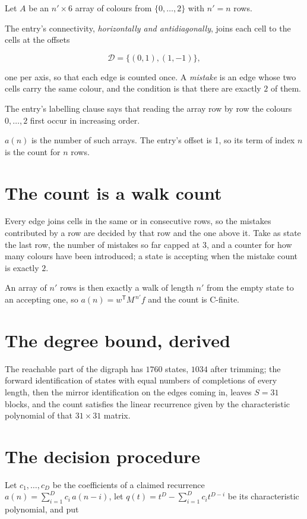 \documentclass[11pt]{article}
\theoremstyle{definition}
\begin{document}
Let $A$ be an $n' \times 6$ array of colours from $\{0,\dots,2\}$ with $n' = n$ rows.

The entry's connectivity, {\itshape horizontally and antidiagonally}, joins each cell to the cells at the offsets

\[\mathcal{D} = \{(0,1), (1,-1)\},\]

one per axis, so that each edge is counted once. A {\itshape mistake} is an edge whose two cells carry the same colour, and the condition is that there are exactly $2$ of them.

The entry's labelling clause says that reading the array row by row the colours $0,\dots,2$ first occur in increasing order.

$a(n)$ is the number of such arrays. The entry's offset is 1, so its term of index $n$ is the count for $n$ rows.

\section{The count is a walk count}

Every edge joins cells in the same or in consecutive rows, so the mistakes contributed by a row are decided by that row and the one above it. Take as state the last row, the number of mistakes so far capped at $3$, and a counter for how many colours have been introduced; a state is accepting when the mistake count is exactly $2$.

An array of $n'$ rows is then exactly a walk of length $n'$ from the empty state to an accepting one, so $a(n) = w^{\mathsf T}M^{\,n'}f$ and the count is C-finite.

\section{The degree bound, derived}

The reachable part of the digraph has $1760$ states, $1034$ after trimming; the forward identification of states with equal numbers of completions of every length, then the mirror identification on the edges coming in, leaves $S = 31$ blocks, and the count satisfies the linear recurrence given by the characteristic polynomial of that $31\times31$ matrix.

\section{The decision procedure}

Let $c_1,\dots,c_D$ be the coefficients of a claimed recurrence $a(n) = \sum_{i=1}^{D} c_i\,a(n-i)$, let $q(t) = t^{D} - \sum_{i=1}^{D} c_i t^{D-i}$ be its characteristic polynomial, and put
\end{document}
